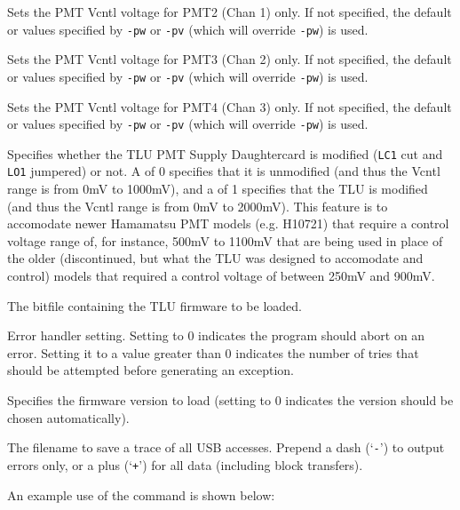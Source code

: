 \begin{description}
Sets the PMT Vcntl voltage for PMT2 (Chan 1) only. If not specified, the default or values specified
by \texttt{-pw} or \texttt{-pv} (which will override \texttt{-pw}) is used.

Sets the PMT Vcntl voltage for PMT3 (Chan 2) only. If not specified, the default or values specified
by \texttt{-pw} or \texttt{-pv} (which will override \texttt{-pw}) is used.

Sets the PMT Vcntl voltage for PMT4 (Chan 3) only. If not specified, the default or values specified
by \texttt{-pw} or \texttt{-pv} (which will override \texttt{-pw}) is used.

Specifies whether the TLU PMT Supply Daughtercard is modified (\texttt{LC1} cut and \texttt{LO1}
jumpered) or not.  A  of 0 specifies that it is unmodified (and thus the Vcntl range is
from 0mV to 1000mV), and a  of 1 specifies that the \gls{TLU} is modified (and thus the
Vcntl range is from 0mV to 2000mV).  This feature is to accomodate newer Hamamatsu PMT models
(e.g. H10721) that require a control voltage range of, for instance, 500mV to 1100mV that are being
used in place of the older (discontinued, but what the \gls{TLU} was designed to accomodate and
control) models that required a control voltage of between 250mV and 900mV.

The bitfile containing the TLU firmware to be loaded.

Error handler setting. Setting to 0 indicates the program should abort on an error. Setting it to a
value greater than 0 indicates the number of tries that should be attempted before generating an
exception.

Specifies the firmware version to load (setting to 0 indicates the version should be chosen automatically).

The filename to save a trace of all USB accesses. Prepend a dash (`\texttt{-}') to output errors
only, or a plus (`\texttt{+}') for all data (including block transfers).
\end{description}

An example use of the command is shown below:

